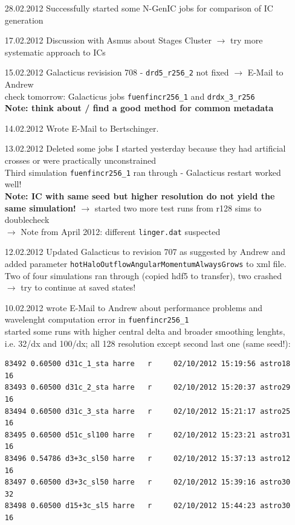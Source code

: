 \documentclass[a4paper,11pt,fleqn,oneside]{book}
\begin{document}
\begin{itemize}
\item[28.02.2012]
Successfully started some N-GenIC jobs for comparison of IC generation \\

\item[17.02.2012]
Discussion with Asmus about Stages Cluster $\rightarrow$ try more systematic 
approach to ICs 

\item[15.02.2012]
Galacticus revisision 708 - \texttt{drd5\_r256\_2} not fixed 
$\rightarrow$ E-Mail to Andrew \\
check tomorrow: Galacticus jobs \texttt{fuenfincr256\_1} and 
\texttt{drdx\_3\_r256} \\
\textbf{Note: think about / find a good method for common metadata} \\

\item[14.02.2012]
Wrote E-Mail to Bertschinger. \\

\item[13.02.2012]
Deleted some jobs I started yesterday because they had artificial crosses 
or were practically unconstrained \\
Third simulation \texttt{fuenfincr256\_1} ran through - Galacticus 
restart worked well! \\
\textbf{Note: IC with same seed but higher resolution do not yield the same 
simulation!} $\rightarrow$ started two more test runs from r128 sims to doublecheck \\
$\rightarrow$ Note from April 2012: different \texttt{linger.dat} 
suspected

\item[12.02.2012]
Updated Galacticus to revision 707 as suggested by Andrew and added parameter 
\texttt{hotHaloOutflowAngularMomentumAlwaysGrows} to xml file. \\
Two of four simulations ran through (copied hdf5 to transfer), 
two crashed $\rightarrow$ try to continue at saved states!

\item[10.02.2012]
wrote E-Mail to Andrew about performance problems and wavelenght computation error 
in \texttt{fuenfincr256\_1} \\
started some runs with higher central delta and broader smoothing lenghts, i.e. 
32/dx and 100/dx; all 128 resolution except second last one (same seed!): 
\begin{verbatim}
83492 0.60500 d31c_1_sta harre   r     02/10/2012 15:19:56 astro18  16        
83493 0.60500 d31c_2_sta harre   r     02/10/2012 15:20:37 astro29  16        
83494 0.60500 d31c_3_sta harre   r     02/10/2012 15:21:17 astro25  16        
83495 0.60500 d51c_sl100 harre   r     02/10/2012 15:23:21 astro31  16  
83496 0.54786 d3+3c_sl50 harre   r     02/10/2012 15:37:13 astro12  16        
83497 0.60500 d3+3c_sl50 harre   r     02/10/2012 15:39:16 astro30  32  
83498 0.60500 d15+3c_sl5 harre   r     02/10/2012 15:44:23 astro30  16        
\end{verbatim}


\end{itemize}
\end{document}
